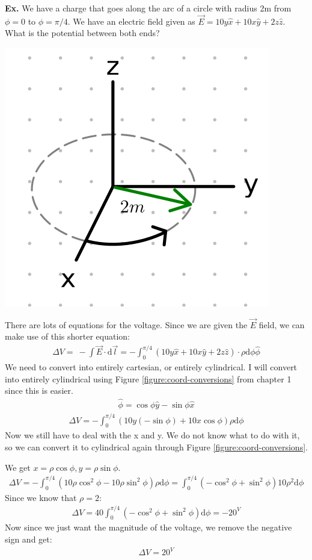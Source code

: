 \documentclass[12pt,letterpaper]{article} \usepackage{amsmath} \usepackage{graphicx} \usepackage[margin=1in]{geometry} \usepackage{longtable}  \usepackage{amssymb}
\begin{document}
	\begin{mdframed}
		\textbf{Ex. }We have a charge that goes along the arc of a circle with radius 2m from $\phi=0$ to $\phi=\pi/4$. We have an electric field given as $\vec E = 10y\hat x + 10x \hat y + 2z\hat z$. What is the potential between both ends?
		\begin{center}
			\includegraphics[width=0.25\linewidth]{voltage-ex1}
		\end{center}
		There are lots of equations for the voltage. Since we are given the $\vec E$ field, we can make use of this shorter equation:
		\begin{align*}
			\Delta V =\ -\int \vec E \cdot \mathrm d \vec l = -\int_0^{\pi/4} \left(10y\hat x + 10x \hat y + 2z\hat z\right)\cdot \rho \mathrm d \phi \hat \phi
		\end{align*}
		We need to convert into entirely cartesian, or entirely cylindrical. I will convert into entirely cylindrical using Figure \ref{figure:coord-conversions} from chapter 1 since this is easier. 
		\begin{align*}
			\hat \phi = \cos\phi \hat y - \sin \phi \hat x
		\end{align*}
		\begin{align*}
			\Delta V = -\int_0^{\pi/4} (10y(-\sin\phi) + 10x\cos\phi)\rho \mathrm d \phi 
		\end{align*}
		Now we still have to deal with the x and y. We do not know what to do with it, so we can convert it to cylindrical again through Figure \ref{figure:coord-conversions}. 
		
		We get $x = \rho \cos \phi, y = \rho\sin\phi$.
		\begin{align*}
			\Delta V = -\int^{\pi/4}_0 (10\rho\cos^2\phi - 10\rho\sin^2\phi)\rho\mathrm d \phi =\int^{\pi/4}_0 (-\cos^2\phi +\sin^2\phi)10\rho^2\mathrm d \phi
		\end{align*}
		Since we know that $\rho = 2$:
		\begin{align*}
			\Delta V = 40\int^{\pi/4}_0 (-\cos^2\phi +\sin^2\phi)\mathrm d \phi = -20^ V
		\end{align*}
		Now since we just want the magnitude of the voltage, we remove the negative sign and get:
		\begin{align*}
			\Delta V = 20^V
		\end{align*}
		
		
		
	\end{mdframed}
	
\end{document}
